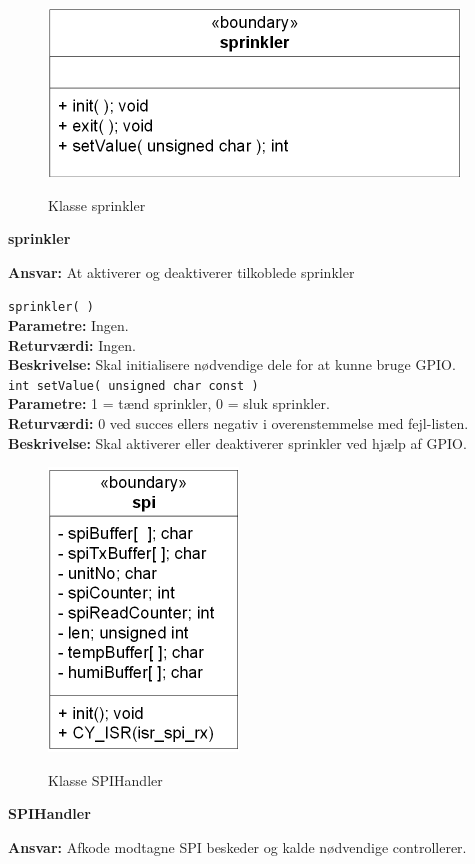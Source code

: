 \begin{figure}[htbp] \centering
{\includegraphics[scale=1.3]{filer/design/Klassediagrammer/sw_psoc_sprinkler}}
\caption{Klasse sprinkler}
\label{fig:sw_psoc_class_sprinkler}
\end{figure} 

{\centering
\textbf{sprinkler}\par
}
\textbf{Ansvar:} At aktiverer og deaktiverer tilkoblede sprinkler \

\verb+sprinkler( )+ \\
\textbf{Parametre:} Ingen. \\
\textbf{Returværdi:} Ingen. \\
\textbf{Beskrivelse:} Skal initialisere nødvendige dele for at kunne bruge GPIO.\\

\verb+int setValue( unsigned char const )+ \\
\textbf{Parametre:} 1 = tænd sprinkler, 0 = sluk sprinkler. \\
\textbf{Returværdi:} 0 ved succes ellers negativ i overenstemmelse med fejl-listen. \\
\textbf{Beskrivelse:} Skal aktiverer eller deaktiverer sprinkler ved hjælp af GPIO.\\

\begin{figure}[htbp] \centering
{\includegraphics[scale=1.3]{filer/design/Klassediagrammer/sw_psoc_SPIhandler}}
\caption{Klasse SPIHandler}
\label{fig:sw_psoc_class_SPIhandler}
\end{figure} 

{\centering
\textbf{SPIHandler}\par
}
\textbf{Ansvar:} Afkode modtagne SPI beskeder og kalde nødvendige controllerer. \
